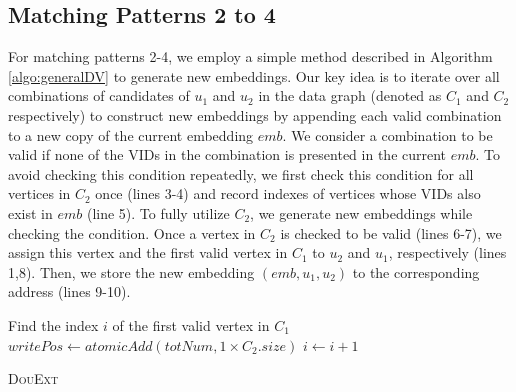 \subsection{Matching Patterns 2 to 4}

For matching patterns 2-4, we employ a simple method described in Algorithm \ref{algo:generalDV} to generate new embeddings. Our key idea is to iterate over all combinations of candidates of $u_{1}$ and $u_{2}$ in the data graph (denoted as $C_1$ and $C_2$ respectively) to construct new embeddings by appending each valid combination to a new copy of the current embedding $emb$. We consider a combination to be valid if none of the VIDs in the combination is presented in the current $emb$. To avoid checking this condition repeatedly, we first check this condition for all vertices in $C_2$ once (lines 3-4) and record indexes of vertices whose VIDs also exist in $emb$ (line 5). To fully utilize $C_2$, we generate new embeddings while checking the condition. Once a vertex in $C_2$ is checked to be valid (lines 6-7), we assign this vertex and the first valid vertex in $C_1$ to $u_2$ and $u_1$, respectively (lines 1,8). Then, we store the new embedding $(emb,u_1,u_2)$ to the corresponding address (lines 9-10).

\begin{algorithm}[t!]
	Find the index $i$ of the first valid vertex in $C_1$\;
	$writePos \leftarrow atomicAdd(totNum,1 \times C_{2}.size)$\;
	$i \leftarrow i+1$\;
	\caption{\textsc{DouExt}}
	\label{algo:generalDV}
\end{algorithm}

